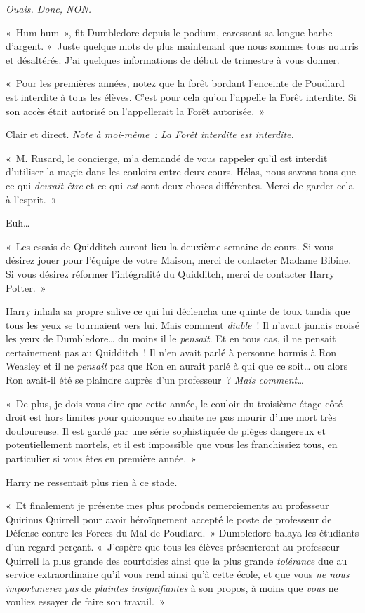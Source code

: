 \emph{Ouais. Donc, NON.}

«~Hum hum~», fit Dumbledore depuis le podium, caressant sa longue barbe d'argent.
«~Juste quelque mots de plus maintenant que nous sommes tous nourris et désaltérés.
J'ai quelques informations de début de trimestre à vous donner.

«~Pour les premières années, notez que la forêt bordant l'enceinte de Poudlard est interdite à tous les élèves.
C'est pour cela qu'on l'appelle la Forêt interdite.
Si son accès était autorisé on l'appellerait la Forêt autorisée.~»

Clair et direct. \emph{Note à moi-même~: La Forêt interdite est interdite.}

«~M. Rusard, le concierge, m'a demandé de vous rappeler qu'il est interdit d'utiliser la magie dans les couloirs entre deux cours.
Hélas, nous savons tous que ce qui \emph{devrait être} et ce qui \emph{est} sont deux choses différentes.
Merci de garder cela à l'esprit.~»

Euh…

«~Les essais de Quidditch auront lieu la deuxième semaine de cours.
Si vous désirez jouer pour l'équipe de votre Maison, merci de contacter Madame Bibine.
Si vous désirez réformer l'intégralité du Quidditch, merci de contacter Harry Potter.~»

Harry inhala sa propre salive ce qui lui déclencha une quinte de toux tandis que tous les yeux se tournaient vers lui.
Mais comment \emph{diable}~!
Il n'avait jamais croisé les yeux de Dumbledore… du moins il le \emph{pensait}.
Et en tous cas, il ne pensait certainement pas au Quidditch~!
Il n'en avait parlé à personne hormis à Ron Weasley et il ne \emph{pensait} pas que Ron en aurait parlé à qui que ce soit… ou alors Ron avait-il été se plaindre auprès d'un professeur~?
\emph{Mais comment…}

«~De plus, je dois vous dire que cette année, le couloir du troisième étage côté droit est hors limites pour quiconque souhaite ne pas mourir d'une mort très douloureuse.
Il est gardé par une série sophistiquée de pièges dangereux et potentiellement mortels, et il est impossible que vous les franchissiez tous, en particulier si vous êtes en première année.~»

Harry ne ressentait plus rien à ce stade.

«~Et finalement je présente mes plus profonds remerciements au professeur Quirinus Quirrell pour avoir héroïquement accepté le poste de professeur de Défense contre les Forces du Mal de Poudlard.~»
Dumbledore balaya les étudiants d'un regard perçant.
«~J'espère que tous les élèves présenteront au professeur Quirrell la plus grande des courtoisies ainsi que la plus grande \emph{tolérance} due au service extraordinaire qu'il vous rend ainsi qu'à cette école, et que vous \emph{ne nous importunerez pas} de \emph{plaintes insignifiantes} à son propos, à moins que \emph{vous} ne vouliez essayer de faire son travail.~»

